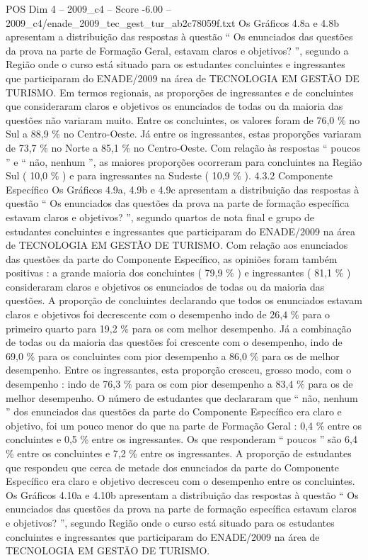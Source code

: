 \begin{textsample}{POS Dim 4 – 2009\_c4 – Score -6.00 – 2009\_c4/enade\_2009\_tec\_gest\_tur\_ab2c78059f.txt}
Os Gráficos 4.8a e 4.8b apresentam a distribuição das respostas à questão “ Os enunciados das questões da prova na parte de Formação Geral, estavam claros e objetivos? ”, segundo a Região onde o curso está situado para os estudantes concluintes e ingressantes que participaram do ENADE/2009 na área de TECNOLOGIA EM GESTÃO DE TURISMO.
Em termos regionais, as proporções de ingressantes e de concluintes que consideraram claros e objetivos os enunciados de todas ou da maioria das questões não variaram muito.
Entre os concluintes, os valores foram de 76,0 \% no Sul a 88,9 \% no Centro-Oeste.
Já entre os ingressantes, estas proporções variaram de 73,7 \% no Norte a 85,1 \% no Centro-Oeste.
Com relação às respostas “ poucos ” e “ não, nenhum ”, as maiores proporções ocorreram para concluintes na Região Sul ( 10,0 \% ) e para ingressantes na Sudeste ( 10,9 \% ). 4.3.2 Componente Específico Os Gráficos 4.9a, 4.9b e 4.9c apresentam a distribuição das respostas à questão “ Os enunciados das questões da prova na parte de formação específica estavam claros e objetivos? ”, segundo quartos de nota final e grupo de estudantes concluintes e ingressantes que participaram do ENADE/2009 na área de TECNOLOGIA EM GESTÃO DE TURISMO.
Com relação aos enunciados das questões da parte do Componente Específico, as opiniões foram também positivas : a grande maioria dos concluintes ( 79,9 \% ) e ingressantes ( 81,1 \% ) consideraram claros e objetivos os enunciados de todas ou da maioria das questões.
A proporção de concluintes declarando que todos os enunciados estavam claros e objetivos foi decrescente com o desempenho indo de 26,4 \% para o primeiro quarto para 19,2 \% para os com melhor desempenho.
Já a combinação de todas ou da maioria das questões foi crescente com o desempenho, indo de 69,0 \% para os concluintes com pior desempenho a 86,0 \% para os de melhor desempenho.
Entre os ingressantes, esta proporção cresceu, grosso modo, com o desempenho : indo de 76,3 \% para os com pior desempenho a 83,4 \% para os de melhor desempenho.
O número de estudantes que declararam que “ não, nenhum ” dos enunciados das questões da parte do Componente Específico era claro e objetivo, foi um pouco menor do que na parte de Formação Geral : 0,4 \% entre os concluintes e 0,5 \% entre os ingressantes.
Os que responderam “ poucos ” são 6,4 \% entre os concluintes e 7,2 \% entre os ingressantes.
A proporção de estudantes que respondeu que cerca de metade dos enunciados da parte do Componente Específico era claro e objetivo decresceu com o desempenho entre os concluintes.
Os Gráficos 4.10a e 4.10b apresentam a distribuição das respostas à questão “ Os enunciados das questões da prova na parte de formação específica estavam claros e objetivos? ”, segundo Região onde o curso está situado para os estudantes concluintes e ingressantes que participaram do ENADE/2009 na área de TECNOLOGIA EM GESTÃO DE TURISMO.

\end{textsample}
